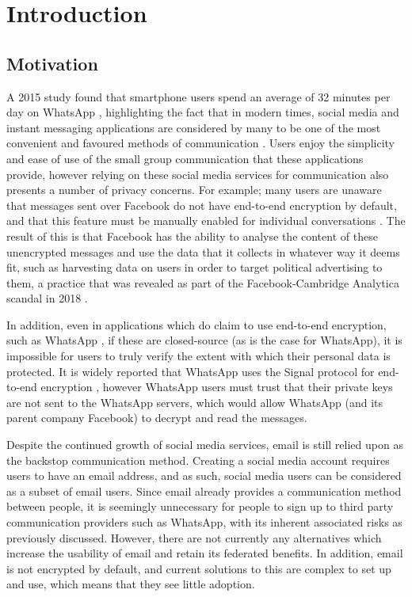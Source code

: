 \chapter{Introduction}


\section{Motivation}

A 2015 study found that smartphone users spend an average of 32 minutes per day on WhatsApp \cite{montag2015}, highlighting the fact that in modern times, social media and instant messaging applications are considered by many to be one of the most convenient and favoured methods of communication \cite{church2013}. Users enjoy the simplicity and ease of use of the small group communication that these applications provide, however relying on these social media services for communication also presents a number of privacy concerns. For example; many users are unaware that messages sent over Facebook do not have end-to-end encryption by default, and that this feature must be manually enabled for individual conversations \cite{facebook2017}. The result of this is that Facebook has the ability to analyse the content of these unencrypted messages and use the data that it collects in whatever way it deems fit, such as harvesting data on users in order to target political advertising to them, a practice that was revealed as part of the Facebook-Cambridge Analytica scandal in 2018 \cite{guardian2018}.

In addition, even in applications which do claim to use end-to-end encryption, such as WhatsApp \cite{whatsapp2017}, if these are closed-source (as is the case for WhatsApp), it is impossible for users to truly verify the extent with which their personal data is protected. It is widely reported that WhatsApp uses the Signal protocol for end-to-end encryption \cite{whatsapp2017}, however WhatsApp users must trust that their private keys are not sent to the WhatsApp servers, which would allow WhatsApp (and its parent company Facebook) to decrypt and read the messages.

Despite the continued growth of social media services, email is still relied upon as the backstop communication method. Creating a social media account requires users to have an email address, and as such, social media users can be considered as a subset of email users. Since email already provides a communication method between people, it is seemingly unnecessary for people to sign up to third party communication providers such as WhatsApp, with its inherent associated risks as previously discussed. However, there are not currently any alternatives which increase the usability of email and retain its federated benefits. In addition, email is not encrypted by default, and current solutions to this are complex to set up and use, which means that they see little adoption.


